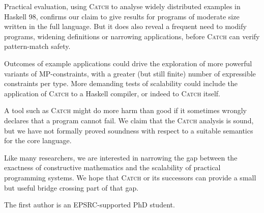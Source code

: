 \documentclass[preprint]{sigplanconf}
\newcommand{\catch}{\textsc{Catch}}
\begin{document}
Practical evaluation, using \catch{} to analyse widely distributed examples
in Haskell 98, confirms our claim to give results for programs of moderate
size written in the full language. But it does also reveal a frequent need
to modify programs, widening definitions or narrowing applications,
before \catch{} can verify pattern-match safety.

Outcomes of example applications could drive the exploration of more
powerful variants of MP-constraints, with a greater (but still finite)
number of expressible constraints per type.  More demanding tests of
scalability could include the application of \catch{} to a Haskell compiler,
or indeed to \catch{} itself.

A tool such as \catch{} might do more harm than good if it sometimes wrongly
declares that a program cannot fail.  We claim that the \catch{} analysis
is sound, but we have not formally proved soundness with respect to a
suitable semantics for the core language.

Like many researchers, we are interested in narrowing the gap between the
exactness of constructive mathematics and the scalability of practical
programming systems.  We hope that \catch{} or its successors can provide
a small but useful bridge crossing part of that gap.

\acks
The first author is an EPSRC-supported PhD student.



\small

\end{document}
